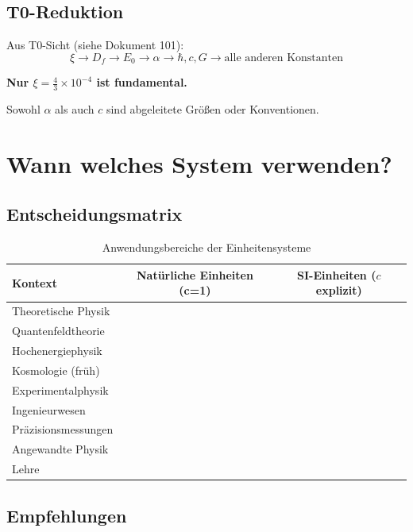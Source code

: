	\subsection{T0-Reduktion}
	
	Aus T0-Sicht (siehe Dokument 101):
	\begin{equation}
		\xi \to D_f \to E_0 \to \alpha \to \hbar, c, G \to \text{alle anderen Konstanten}
	\end{equation}
	
	\textbf{Nur $\xi = \frac{4}{3} \times 10^{-4}$ ist fundamental.}
	
	Sowohl $\alpha$ als auch $c$ sind abgeleitete Größen oder Konventionen.
	
	\section{Wann welches System verwenden?}
	
	\subsection{Entscheidungsmatrix}
	
	\begin{table}[h]
		\centering
		\begin{tabular}{|l|c|c|}
			\hline
			\textbf{Kontext} & \textbf{Natürliche Einheiten (c=1)} & \textbf{SI-Einheiten ($c$ explizit)} \\
			\hline
			Theoretische Physik & \checkmark & \\
			Quantenfeldtheorie & \checkmark & \\
			Hochenergiephysik & \checkmark & \\
			Kosmologie (früh) & \checkmark & \\
			\hline
			Experimentalphysik & & \checkmark \\
			Ingenieurwesen & & \checkmark \\
			Präzisionsmessungen & & \checkmark \\
			Angewandte Physik & & \checkmark \\
			Lehre & & \checkmark \\
			\hline
		\end{tabular}
		\caption{Anwendungsbereiche der Einheitensysteme}
	\end{table}
	
	\subsection{Empfehlungen}
	

